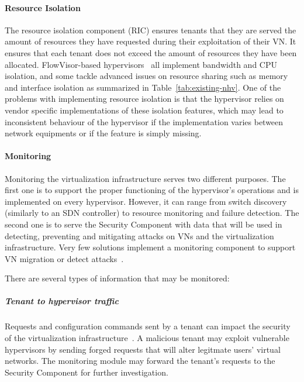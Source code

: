 \paragraph{Resource Isolation}
The resource isolation component (RIC) ensures tenants that they are served the amount of resources they have requested during their exploitation of their VN.
It ensures that each tenant does not exceed the amount of resources they have been allocated.
FlowVisor-based hypervisors~\cite{FlowVisor-Sherwood2009,ADVisor-Salvadori2012,VeRTIGO-Corin2012a,EnhancedFV-Min2012,SlicesIsolator-El-Azzab2011,DoubleFV-Yin2013} all implement bandwidth and CPU isolation, and some tackle advanced issues on resource sharing such as memory and interface isolation as summarized in Table~\ref{tab:existing-nhv}. One of the problems with implementing resource isolation is that the hypervisor relies on vendor specific implementations of these isolation features, which may lead to inconsistent behaviour of the hypervisor if the implementation varies between network equipments or if the feature is simply missing.


\paragraph{Monitoring}
Monitoring the virtualization infrastructure serves two different purposes.
The first one is to support the proper functioning of the hypervisor's operations and is implemented on every hypervisor. However, it can range from switch discovery (similarly to an SDN controller) to resource monitoring and failure detection.
The second one is to serve the Security Component with data that will be used in detecting, preventing and mitigating attacks on VNs and the virtualization infrastructure.
Very few solutions implement a monitoring component to support VN migration or detect attacks~\cite{VeRTIGO-Corin2012a,CoVisor-Jin2015,FlowN-Drutskoy2012,AutoSlice-Bozakov2012,NVP-Koponen2014,ONVisor-Han2018}.

There are several types of information that may be monitored:

\subparagraph{Tenant to hypervisor traffic} Requests and configuration commands sent by a tenant can impact the security of the virtualization infrastructure~\cite{You2014,Costa2015}. A malicious tenant may exploit vulnerable hypervisors by sending forged requests that will alter legitmate users' virtual networks. The monitoring module may forward the tenant's requests to the Security Component for further investigation.

